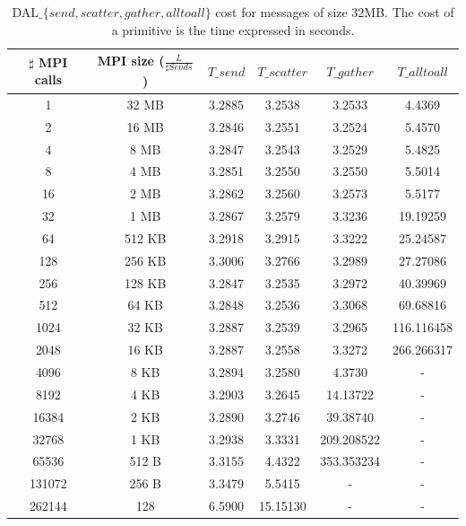 \begin{table}[h]
\begin{center}
\begin{tabular}{|c|c|c|c|c|c|}\hline
\hline
$\sharp$ MPI calls & MPI size ($\frac{L}{\sharp Sends}$)  & $T\_send$   & $T\_scatter$  & $T\_gather$ & $T\_alltoall$      \\\hline\hline
1 & 32 MB & 3.2885 & 3.2538 & 3.2533 & 4.4369 \\\hline
2 & 16 MB & 3.2846 & 3.2551 & 3.2524 & 5.4570 \\\hline
4 & 8 MB & 3.2847 & 3.2543 & 3.2529 & 5.4825 \\\hline
8 & 4 MB & 3.2851 & 3.2550 & 3.2550 & 5.5014 \\\hline
16 & 2 MB & 3.2862 & 3.2560 & 3.2573 & 5.5177 \\\hline
32 & 1 MB & 3.2867 & 3.2579 & 3.3236 & 19.19259 \\\hline
64 & 512 KB & 3.2918 & 3.2915 & 3.3222 & 25.24587 \\\hline
128 & 256 KB & 3.3006 & 3.2766 & 3.2989 & 27.27086 \\\hline
256 & 128 KB & 3.2847 & 3.2535 & 3.2972 & 40.39969 \\\hline
512 & 64 KB & 3.2848 & 3.2536 & 3.3068 & 69.68816 \\\hline
1024 & 32 KB & 3.2887 & 3.2539 & 3.2965 & 116.116458 \\\hline
2048 & 16 KB & 3.2887 & 3.2558 & 3.3272 & 266.266317 \\\hline
4096 & 8 KB & 3.2894 & 3.2580 & 4.3730 & - \\\hline
8192 & 4 KB & 3.2903 & 3.2645 & 14.13722 & - \\\hline
16384 & 2 KB & 3.2890 & 3.2746 & 39.38740 & - \\\hline
32768 & 1 KB & 3.2938 & 3.3331 & 209.208522 & - \\\hline
65536 & 512 B & 3.3155 & 4.4322 & 353.353234 & - \\\hline
131072 & 256 B & 3.3479 & 5.5415 & - & - \\\hline
262144 & 128 & 6.5900 & 15.15130 & - & - \\\hline
\end{tabular}
\caption{DAL$\_\lbrace send, scatter, gather, alltoall \rbrace$ cost for messages of size 32MB. The cost of a primitive is the time expressed in seconds. }
\label{tsetup-pianosa-n8-M32}
\end{center}
\end{table}

